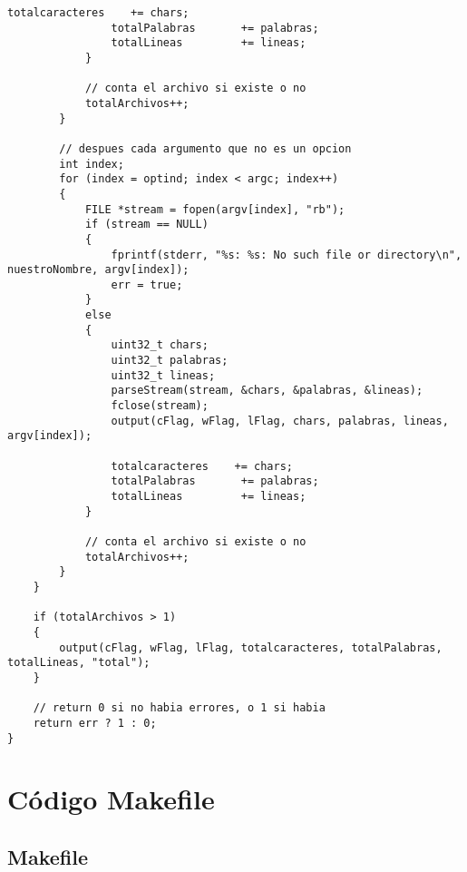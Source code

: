\documentclass[a4paper]{article}
\begin{document}
\begin{lstlisting}[style=CStyle]
                totalcaracteres    += chars;
                totalPalabras       += palabras;
                totalLineas         += lineas;
            }

            // conta el archivo si existe o no
            totalArchivos++;
        }

        // despues cada argumento que no es un opcion
        int index;
        for (index = optind; index < argc; index++)
        {
            FILE *stream = fopen(argv[index], "rb");
            if (stream == NULL)
            {
                fprintf(stderr, "%s: %s: No such file or directory\n", nuestroNombre, argv[index]);
                err = true;
            }
            else
            {
                uint32_t chars;
                uint32_t palabras;
                uint32_t lineas;
                parseStream(stream, &chars, &palabras, &lineas);
                fclose(stream);
                output(cFlag, wFlag, lFlag, chars, palabras, lineas, argv[index]);

                totalcaracteres    += chars;
                totalPalabras       += palabras;
                totalLineas         += lineas;
            }

            // conta el archivo si existe o no
            totalArchivos++;
        }
    }

    if (totalArchivos > 1)
    {
        output(cFlag, wFlag, lFlag, totalcaracteres, totalPalabras, totalLineas, "total");
    }

    // return 0 si no habia errores, o 1 si habia
    return err ? 1 : 0;
}
\end{lstlisting}
\pagebreak

\section{Código Makefile}
\subsection{Makefile}
\end{document}
